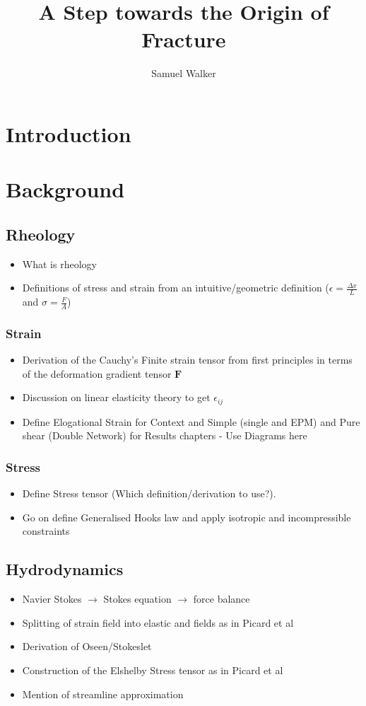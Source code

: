 \documentclass{library/duthesis}
\title{A Step towards the Origin of Fracture}
\author{Samuel Walker}
\begin{document}
 
\frontmatter
\titlepage
\newpage

\mainmatter
\chapter{Introduction} 


\chapter{Background}
\section{Rheology}
\begin{itemize}
    \item What is rheology
    \item Definitions of stress and strain from an intuitive/geometric definition ($\epsilon = \frac{\Delta x}{L}$ and $\sigma = \frac{F}{A}$)
\end{itemize}
\subsection{Strain}
\begin{itemize}
    \item Derivation of the Cauchy’s Finite strain tensor from first principles in terms of the deformation gradient tensor $\bm{F}$
    \item Discussion on linear elasticity theory to get $\epsilon_{ij}$
    \item Define Elogational Strain for Context and Simple (single and EPM) and Pure shear (Double Network) for Results chapters - Use Diagrams here
\end{itemize}
\subsection{Stress}
\begin{itemize}
    \item Define Stress tensor (Which definition/derivation to use?).
    \item Go on define Generalised Hooks law and apply isotropic and incompressible constraints
\end{itemize}

\section{Hydrodynamics}
\begin{itemize}
    \item Navier Stokes $\rightarrow$ Stokes equation $\rightarrow$ force balance
    \item Splitting of strain field into elastic and  fields as in Picard et al
    \item Derivation of Oseen/Stokeslet 
    \item Construction of the Elshelby Stress tensor as in Picard et al
    \item Mention of streamline approximation
\end{itemize}
\end{document}
